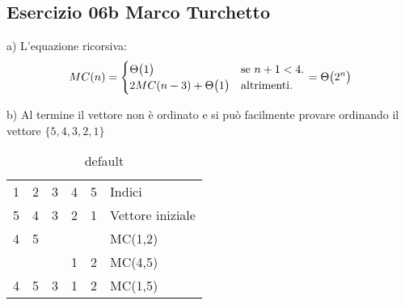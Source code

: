 
\subsection[06b MT]{Esercizio 06b Marco Turchetto}

a) L'equazione ricorsiva: 
	\begin{equation*}
		MC(n)=\begin{cases}
			\Theta\bigl(1\bigr)				& \text{se $n +1  < 4$}.\\
			2MC(n - 3) + \Theta\bigl(1\bigr)	& \text{altrimenti}.
 		\end{cases}
		= \Theta\bigl(2^n\bigr)
	\end{equation*}
	
	
	
b) Al termine il vettore non è ordinato e si può facilmente provare ordinando il vettore
	$ \{ 5, 4, 3, 2, 1 \} $
	
	\begin{table}[htdp]
		\caption{default}
		\begin{center}
		\begin{tabular}{*{5}{|c}|l}
			1 & 2 & 3 & 4 & 5 & Indici \\ 
			5 & 4 & 3 & 2 & 1 & Vettore iniziale \\ 
			4 & 5 &   &   &   & MC(1,2) \\ 
			  &   &   & 1 & 2 & MC(4,5) \\ 
			4 & 5 & 3 & 1 & 2 & MC(1,5) \\ 
		\end{tabular}
		\end{center}
		\label{default}
	\end{table}

